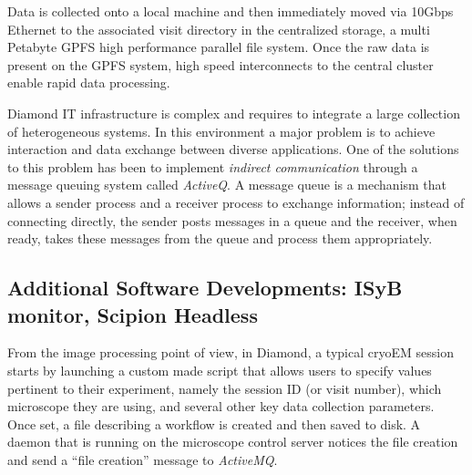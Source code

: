 Data is collected onto a local machine %
and then immediately moved via 10Gbps Ethernet to the associated visit directory in the centralized storage, a multi Petabyte GPFS high performance parallel file system.  Once the raw data is present on the GPFS system, high speed interconnects to the central cluster enable rapid data processing. %

Diamond IT infrastructure is complex and requires to integrate a large collection of heterogeneous systems. In this environment a major problem is to achieve interaction and data exchange between diverse applications. One of the solutions to this problem has been to implement \emph{indirect communication} through a message queuing system called \emph{ActiveQ}. A message queue is a mechanism
that allows a sender process and a receiver process to exchange information; instead of connecting directly, the sender posts messages in a queue and the receiver, when ready, takes these messages from the queue and process them appropriately. 



\subsection{Additional Software Developments: ISyB monitor, Scipion Headless}

From the image processing point of view, in Diamond, a typical cryoEM session starts by launching a custom made script that  allows users to specify values pertinent to their experiment, namely the session ID (or visit number), which microscope they are using, and several other key data collection parameters. Once set, a file describing a \scipion workflow is created and then saved to disk.
A daemon that is running on the microscope control server notices the file creation and send a ``file creation'' message to \emph{ActiveMQ}. 


